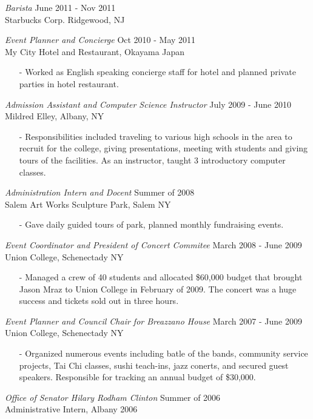 \documentclass[margin, 10pt]{res} %
\begin{document}
\begin{resume}
{\sl Barista} \hfill June 2011 - Nov 2011 \\
Starbucks Corp. Ridgewood, NJ

{\sl Event Planner and Concierge} \hfill Oct 2010 - May 2011 \\
My City Hotel and Restaurant, Okayama Japan
\begin{itemize} \itemsep -2pt
\item[-] Worked as English speaking concierge staff for hotel and planned private parties in hotel restaurant.
\end{itemize}

{\sl Admission Assistant and Computer Science Instructor} \hfill July 2009 - June 2010 \\
Mildred Elley, Albany, NY
\begin{itemize} \itemsep -2pt
\item[-] Responsibilities included traveling to various high schools in the area to recruit for the college, giving presentations, meeting with students and giving tours of the facilities.  As an instructor, taught 3 introductory computer classes.
\end{itemize}

{\sl Administration Intern and Docent} \hfill Summer of 2008 \\
Salem Art Works Sculpture Park, Salem NY
\begin{itemize} \itemsep -2pt
\item[-] Gave daily guided tours of park, planned monthly fundraising events. 
\end{itemize}

{\sl Event Coordinator and President of Concert Commitee} \hfill March 2008 - June 2009 \\
Union College, Schenectady NY
\begin{itemize} \itemsep -2pt
\item[-] Managed a crew of 40 students and allocated \$60,000 budget that brought Jason Mraz to Union College in February of 2009. The concert was a huge success and tickets sold out in three hours.
\end{itemize}

{\sl Event Planner and Council Chair for Breazzano House} \hfill March 2007 - June 2009 \\
Union College, Schenectady NY
\begin{itemize} \itemsep -2pt
\item[-] Organized numerous events including batle of the bands, community service projects, Tai Chi classes, sushi teach-ins, jazz conerts, and secured guest speakers.  Responsible for tracking an annual budget of \$30,000.
\end{itemize}

{\sl Office of Senator Hilary Rodham Clinton} \hfill Summer of 2006 \\
Administrative Intern, Albany 2006

\end{resume}
\end{document}
